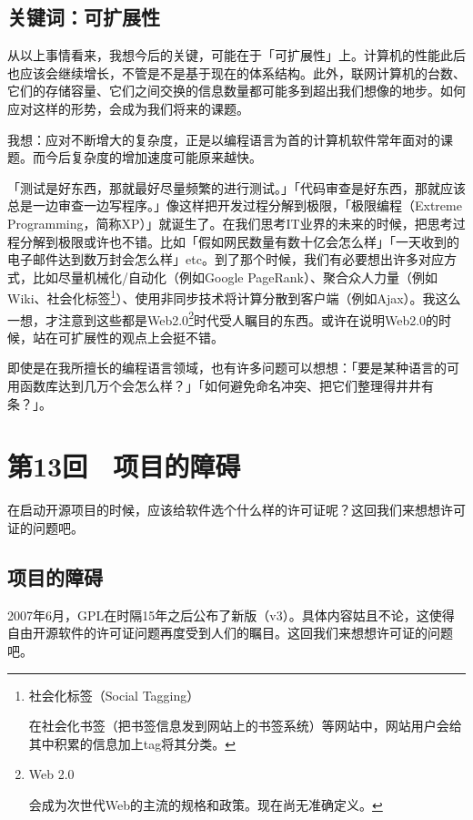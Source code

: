 \documentclass[a4paper,12pt]{article}
\begin{document}
\subsection{关键词：可扩展性}

从以上事情看来，我想今后的关键，可能在于「可扩展性」上。计算机的性能此后也应该会继续增长，不管是不是基于现在的体系结构。此外，联网计算机的台数、它们的存储容量、它们之间交换的信息数量都可能多到超出我们想像的地步。如何应对这样的形势，会成为我们将来的课题。

我想：应对不断增大的复杂度，正是以编程语言为首的计算机软件常年面对的课题。而今后复杂度的增加速度可能原来越快。

「测试是好东西，那就最好尽量频繁的进行测试。」「代码审查是好东西，那就应该总是一边审查一边写程序。」像这样把开发过程分解到极限，「极限编程（Extreme Programming，简称XP）」就诞生了。在我们思考IT业界的未来的时候，把思考过程分解到极限或许也不错。比如「假如网民数量有数十亿会怎么样」「一天收到的电子邮件达到数万封会怎么样」etc。到了那个时候，我们有必要想出许多对应方式，比如尽量机械化/自动化（例如Google PageRank）、聚合众人力量（例如Wiki、社会化标签\footnote{社会化标签（Social Tagging）

    在社会化书签（把书签信息发到网站上的书签系统）等网站中，网站用户会给其中积累的信息加上tag将其分类。}）、使用非同步技术将计算分散到客户端（例如Ajax）。我这么一想，才注意到这些都是Web2.0\footnote{Web 2.0

会成为次世代Web的主流的规格和政策。现在尚无准确定义。}时代受人瞩目的东西。或许在说明Web2.0的时候，站在可扩展性的观点上会挺不错。

即使是在我所擅长的编程语言领域，也有许多问题可以想想：「要是某种语言的可用函数库达到几万个会怎么样？」「如何避免命名冲突、把它们整理得井井有条？」。


\section{第13回　项目的障碍}

在启动开源项目的时候，应该给软件选个什么样的许可证呢？这回我们来想想许可证的问题吧。

\subsection{项目的障碍}

2007年6月，GPL在时隔15年之后公布了新版（v3）。具体内容姑且不论，这使得自由开源软件的许可证问题再度受到人们的瞩目。这回我们来想想许可证的问题吧。
\end{document}
